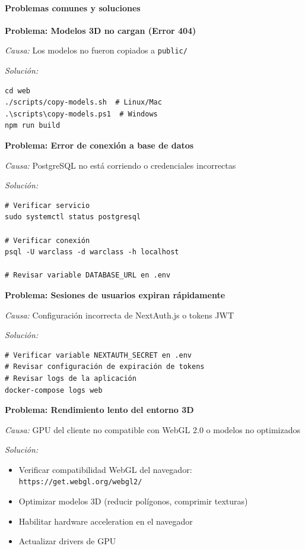 \paragraph{Problemas comunes y soluciones}

\textbf{Problema: Modelos 3D no cargan (Error 404)}

\textit{Causa:} Los modelos no fueron copiados a \texttt{public/}

\textit{Solución:}
\begin{verbatim}
cd web
./scripts/copy-models.sh  # Linux/Mac
.\scripts\copy-models.ps1  # Windows
npm run build
\end{verbatim}

\textbf{Problema: Error de conexión a base de datos}

\textit{Causa:} PostgreSQL no está corriendo o credenciales incorrectas

\textit{Solución:}
\begin{verbatim}
# Verificar servicio
sudo systemctl status postgresql

# Verificar conexión
psql -U warclass -d warclass -h localhost

# Revisar variable DATABASE_URL en .env
\end{verbatim}

\textbf{Problema: Sesiones de usuarios expiran rápidamente}

\textit{Causa:} Configuración incorrecta de NextAuth.js o tokens JWT

\textit{Solución:}
\begin{verbatim}
# Verificar variable NEXTAUTH_SECRET en .env
# Revisar configuración de expiración de tokens
# Revisar logs de la aplicación
docker-compose logs web
\end{verbatim}

\textbf{Problema: Rendimiento lento del entorno 3D}

\textit{Causa:} GPU del cliente no compatible con WebGL 2.0 o modelos no optimizados

\textit{Solución:}
\begin{itemize}
	\item Verificar compatibilidad WebGL del navegador: \texttt{https://get.webgl.org/webgl2/}
	\item Optimizar modelos 3D (reducir polígonos, comprimir texturas)
	\item Habilitar hardware acceleration en el navegador
	\item Actualizar drivers de GPU
\end{itemize}

